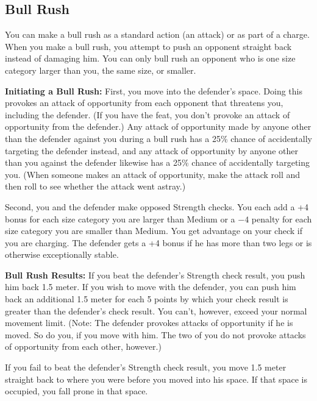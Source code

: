 \subsection{Bull Rush}
You can make a bull rush as a standard action (an attack) or as part of a charge. When you make a bull rush, you attempt to push an opponent straight back instead of damaging him. You can only bull rush an opponent who is one size category larger than you, the same size, or smaller.

\textbf{Initiating a Bull Rush:} First, you move into the defender's space. Doing this provokes an attack of opportunity from each opponent that threatens you, including the defender. (If you have the  feat, you don't provoke an attack of opportunity from the defender.) Any attack of opportunity made by anyone other than the defender against you during a bull rush has a 25\% chance of accidentally targeting the defender instead, and any attack of opportunity by anyone other than you against the defender likewise has a 25\% chance of accidentally targeting you. (When someone makes an attack of opportunity, make the attack roll and then roll to see whether the attack went astray.)

Second, you and the defender make opposed Strength checks. You each add a +4 bonus for each size category you are larger than Medium or a $-4$ penalty for each size category you are smaller than Medium. You get advantage on your check if you are charging. The defender gets a +4 bonus if he has more than two legs or is otherwise exceptionally stable.

\textbf{Bull Rush Results:} If you beat the defender's Strength check result, you push him back 1.5 meter. If you wish to move with the defender, you can push him back an additional 1.5 meter for each 5 points by which your check result is greater than the defender's check result. You can't, however, exceed your normal movement limit. (Note: The defender provokes attacks of opportunity if he is moved. So do you, if you move with him. The two of you do not provoke attacks of opportunity from each other, however.)

If you fail to beat the defender's Strength check result, you move 1.5 meter straight back to where you were before you moved into his space. If that space is occupied, you fall prone in that space.